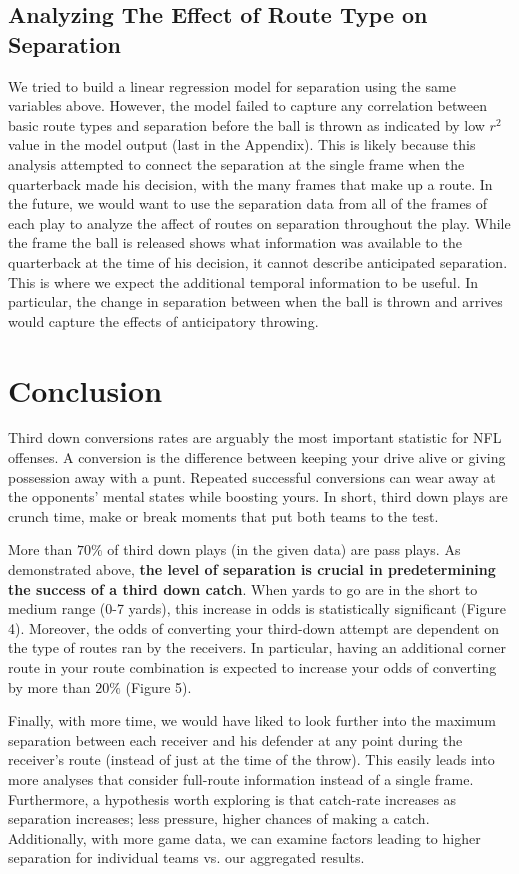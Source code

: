 \documentclass[12pt,letterpaper]{article}
\begin{document}
\subsection*{Analyzing The Effect of Route Type on Separation}

We tried to build a linear regression model for separation using the same variables above. However, the model failed to capture any correlation between basic route types and separation before the ball is thrown as indicated by low $r^2$ value in the model output (last in the Appendix). This is likely because this analysis attempted to connect the separation at the single frame when the quarterback made his decision, with the many frames that make up a route. In the future, we would want to use the separation data from all of the frames of each play to analyze the affect of routes on separation throughout the play. While the frame the ball is released shows what information was available to the quarterback at the time of his decision, it cannot describe anticipated separation. This is where we expect the additional temporal information to be useful. In particular, the change in separation between when the ball is thrown and arrives would capture the effects of anticipatory throwing.


\section*{Conclusion}
Third down conversions rates are arguably the most important statistic for NFL offenses. A conversion is the difference between keeping your drive alive or giving possession away with a punt. Repeated successful conversions can wear away at the opponents' mental states while boosting yours. In short, third down plays are crunch time, make or break moments that put both teams to the test. 

More than $70\%$ of third down plays (in the given data) are pass plays. As demonstrated above, \textbf{the level of separation is crucial in predetermining the success of a third down catch}. When yards to go are in the short to medium range (0-7 yards), this increase in odds is statistically significant (Figure 4). Moreover, the odds of converting your third-down attempt are dependent on the type of routes ran by the receivers. In particular, having an additional corner route in your route combination is expected to increase your odds of converting by more than $20\%$ (Figure 5).

Finally, with more time, we would have liked to look further into the maximum separation between each receiver and his defender at any point during the receiver's route (instead of just at the time of the throw). This easily leads into more analyses that consider full-route information instead of a single frame. Furthermore, a hypothesis worth exploring is that catch-rate increases as separation increases; less pressure, higher chances of making a catch. Additionally, with more game data, we can examine factors leading to higher separation for individual teams vs. our aggregated results. 
\end{document}
